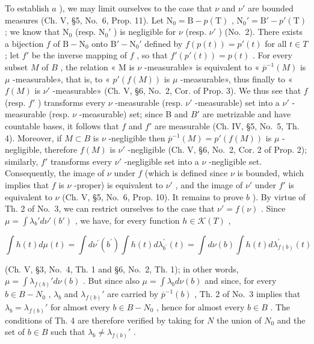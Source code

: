 To establish \(a\) ), we may limit ourselves to the case that \(\nu\) and \(\nu'\) are bounded measures (Ch. V, §5, No.~6, Prop. 11). Let \(\mathrm{N}_0 = \mathrm{B} - p(\mathrm{T})\) , \(\mathrm{N}_0' = \mathrm{B}' - p'(\mathrm{T})\) ; we know that \(\mathrm{N}_0\) (resp. \(\mathrm{N}_0'\) ) is negligible for \(\nu\) (resp. \(\nu'\) ) (No.~2). There exists a bijection \(f\) of \(\mathrm{B} - \mathrm{N}_0\) onto \(\mathrm{B}' - \mathrm{N}_0'\) defined by \(f(p(t)) = p'(t)\) for all \(t \in T\) ; let \(f'\) be the inverse mapping of \(f\) , so that \(f'(p'(t)) = p(t)\) . For every subset \(M\) of \(B\) , the relation « M is \(\nu\) -measurable» is equivalent to « \(\overline{p}^{-1}(M)\) is \(\mu\) -measurable», that is, to « \(p'(f(M))\) is \(\mu\) -measurable», thus finally to « \(f(M)\) is \(\nu'\) -measurable» (Ch. V, §6, No.~2, Cor. of Prop. 3). We thus see that \(f\) (resp. \(f'\) ) transforms every \(\nu\) -measurable (resp. \(\nu'\) -measurable) set into a \(\nu'\) -measurable (resp. \(\nu\) -measurable) set; since B and \(B'\) are metrizable and have countable bases, it follows that \(f\) and \(f'\) are measurable (Ch. IV, §5, No.~5, Th. 4). Moreover, if \(M \subset B\) is \(\nu\) -negligible then \(\overline{p}^{-1}(M) = p'(f(M))\) is \(\mu\) -negligible, therefore \(f(M)\) is \(\nu'\) -negligible (Ch. V, §6, No.~2, Cor. 2 of Prop. 2); similarly, \(f'\) transforms every \(\nu'\) -negligible set into a \(\nu\) -negligible set. Consequently, the image of \(\nu\) under \(f\) (which is defined since \(\nu\) is bounded, which implies that \(f\) is \(\nu\) -proper) is equivalent to \(\nu'\) , and the image of \(\nu'\) under \(f'\) is equivalent to \(\nu\) (Ch. V, §5, No.~6, Prop. 10). It remains to prove \(b\) ). By virtue of Th. 2 of No.~3, we can restrict ourselves to the case that \(\nu' = f(\nu)\) . Since \(\mu = \int \lambda_b' d\nu'(b')\) , we have, for every function \(h \in \mathcal{K}(T)\) ,

\[
\int h (t) d \mu (t) = \int d \nu^ {\prime} (b ^ {\prime}) \int h (t) d \lambda_ {b ^ {\prime}} ^ {\prime} (t) = \int d \nu (b) \int h (t) d \lambda_ {f (b)} ^ {\prime} (t)
\]

(Ch. V, §3, No.~4, Th. 1 and §6, No.~2, Th. 1); in other words, \(\mu = \int \lambda_{f(b)}' d\nu(b)\) . But since also \(\mu = \int \lambda_b d\nu(b)\) and since, for every \(b \in B - N_0\) , \(\lambda_b\) and \(\lambda_{f(b)}'\) are carried by \(\overline{p}^{-1}(b)\) , Th. 2 of No.~3 implies that \(\lambda_b = \lambda_{f(b)}'\) for almost every \(b \in B - N_0\) , hence for almost every \(b \in B\) . The conditions of Th. 4 are therefore verified by taking for \(N\) the union of \(N_0\) and the set of \(b \in B\) such that \(\lambda_b \neq \lambda_{f(b)}'\) .

\appendix
